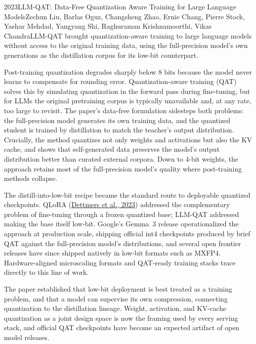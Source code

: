 
\begin{papersummary}{2023}{LLM-QAT: Data-Free Quantization Aware Training for Large Language Models}{Zechun Liu, Barlas Oguz, Changsheng Zhao, Ernie Chang, Pierre Stock, Yashar Mehdad, Yangyang Shi, Raghuraman Krishnamoorthi, Vikas Chandra}{LLM-QAT brought quantization-aware training to large language models without access to the original training data, using the full-precision model's own generations as the distillation corpus for its low-bit counterpart.}

Post-training quantization degrades sharply below 8 bits because the model never learns to compensate for rounding error. Quantization-aware training (QAT) solves this by simulating quantization in the forward pass during fine-tuning, but for LLMs the original pretraining corpus is typically unavailable and, at any rate, too large to revisit. The paper's data-free formulation sidesteps both problems: the full-precision model generates its own training data, and the quantized student is trained by distillation to match the teacher's output distribution. Crucially, the method quantizes not only weights and activations but also the KV cache, and shows that self-generated data preserves the model's output distribution better than curated external corpora. Down to 4-bit weights, the approach retains most of the full-precision model's quality where post-training methods collapse.

The distill-into-low-bit recipe became the standard route to deployable quantized checkpoints. QLoRA (\hyperref[paper:dettmers-2023-qlora]{Dettmers et al., 2023}) addressed the complementary problem of fine-tuning through a frozen quantized base; LLM-QAT addressed making the base itself low-bit. Google's Gemma~3 release operationalized the approach at production scale, shipping official int4 checkpoints produced by brief QAT against the full-precision model's distributions, and several open frontier releases have since shipped natively in low-bit formats such as MXFP4. Hardware-aligned microscaling formats and QAT-ready training stacks trace directly to this line of work.

The paper established that low-bit deployment is best treated as a training problem, and that a model can supervise its own compression, connecting quantization to the distillation lineage. Weight, activation, and KV-cache quantization as a joint design space is now the framing used by every serving stack, and official QAT checkpoints have become an expected artifact of open model releases.

\end{papersummary}
